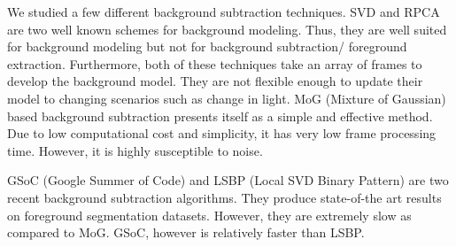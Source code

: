 We studied a few different background subtraction techniques. SVD\cite{chetverikov2010approximation} and RPCA\cite{candes2011robust} are two well known schemes for background modeling. Thus, they are well suited for background modeling but not for background subtraction/ foreground extraction. Furthermore, both of these techniques take an array of frames to develop the background model. They are not flexible enough to update their model to changing scenarios such as change in light. MoG (Mixture of Gaussian)\cite{zivkovic2006efficient} based background subtraction presents itself as a simple and effective method. Due to low computational cost and simplicity, it has very low frame processing time. However, it is highly susceptible to noise.

GSoC (Google Summer of Code)\cite{ref_gsoc} and LSBP (Local SVD Binary Pattern) \cite{guo2016background} are two recent background subtraction algorithms. They produce state-of-the art results on foreground segmentation datasets. However, they are extremely slow as compared to MoG. GSoC, however is relatively faster than LSBP.  





\newpage